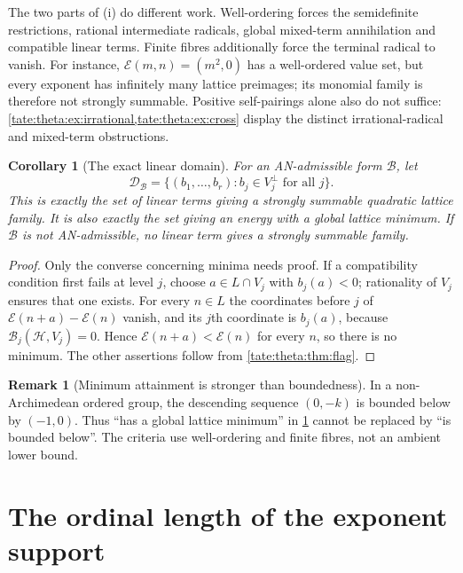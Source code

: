 \documentclass[11pt,letterpaper]{article}
\newtheorem{corollary}[corollary]{Corollary}
\theoremstyle{definition}
\newtheorem{remark}[remark]{Remark}
\newcommand{\cB}{\mathcal B}
\newcommand{\cH}{\mathcal H}
\newcommand{\cE}{\mathcal E}
\begin{document}
The two parts of (i) do different work. Well-ordering forces the
semidefinite restrictions, rational intermediate radicals, global mixed-term
annihilation and compatible linear terms. Finite fibres additionally
force the terminal radical to vanish. For instance,
$\cE(m,n)=(m^2,0)$ has a well-ordered value set, but every exponent
has infinitely many lattice preimages; its monomial family is therefore
not strongly summable. Positive self-pairings alone also do not suffice:
\cref{tate:theta:ex:irrational,tate:theta:ex:cross} display the distinct
irrational-radical and mixed-term obstructions.

\begin{corollary}[The exact linear domain]\label{tate:theta:cor:domain}
For an AN-admissible form $\cB$, let
\begin{equation}
 \mathcal D_{\cB}=\{(b_1,\ldots,b_r):b_j\in V_j^\perp\text{ for all }j\}.
 \label{tate:theta:eq:D}
\end{equation}
This is exactly the set of linear terms giving a strongly summable
quadratic lattice family. It is also exactly the set giving an energy with a
global lattice minimum. If $\cB$ is not AN-admissible, no linear term gives
a strongly summable family.
\end{corollary}

\begin{proof}
Only the converse concerning minima needs proof. If a compatibility
condition first fails at level $j$, choose $a\in L\cap V_j$ with
$b_j(a)<0$; rationality of $V_j$ ensures that one exists. For every
$n\in L$ the coordinates before $j$ of $\cE(n+a)-\cE(n)$ vanish, and its
$j$th coordinate is $b_j(a)$, because $\cB_j(\cH,V_j)=0$. Hence
$\cE(n+a)<\cE(n)$ for every $n$, so there is no minimum. The other
assertions follow from \cref{tate:theta:thm:flag}.
\end{proof}

\begin{remark}[Minimum attainment is stronger than boundedness]\label{tate:theta:rem:bounds}
In a non-Archimedean ordered group, the descending sequence $(0,-k)$ is
bounded below by $(-1,0)$. Thus ``has a global lattice minimum'' in
\cref{tate:theta:cor:domain} cannot be replaced by ``is bounded below''.
The criteria use well-ordering and finite fibres, not an ambient lower
bound.
\end{remark}

\section{The ordinal length of the exponent support}\label{tate:theta:sec:ordinal}
\end{document}
